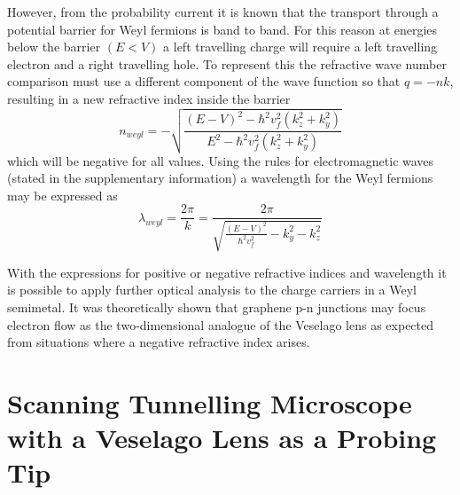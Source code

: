 \documentclass[prb,twocolumn,aps,superscriptaddress,showpacs,floatfix]{revtex4}
\begin{document}
	However, from the probability current it is known that the transport through a potential barrier for Weyl fermions is band to band. For this reason at energies below the barrier $(E<V)$ a left travelling charge will require a left travelling electron and a right travelling hole. To represent this the refractive wave number comparison must use a different component of the wave function so that $q=-nk$, resulting in a new refractive index inside the barrier
	\begin{equation}
		n_{weyl}=-\sqrt{\frac{\left(E-V\right)^{2}-\hbar^{2} v_{f}^{2}\left(k_{z}^{2}+k_{y}^{2}\right)}{E^{2}-\hbar^{2} v_{f}^{2}\left(k_{z}^{2}+k_{y}^{2}\right)}}
	\end{equation}
	which will be negative for all values. Using the rules for electromagnetic waves (stated in the supplementary information) a wavelength for the Weyl fermions may be expressed as
	\begin{equation}
		\lambda_{weyl}=\frac{2\pi}{k}=\frac{2\pi}{\sqrt{\frac{\left(E-V\right)^{2}}{\hbar^{2}v_{f}^{2}}-k_{y}^{2}-k_{z}^{2}}}
	\end{equation}

	With the expressions for positive or negative refractive indices and wavelength it is possible to apply further optical analysis to the charge carriers in a Weyl semimetal. It was theoretically shown that graphene p-n junctions may focus electron flow as the two-dimensional analogue of the Veselago lens\cite{p1} as expected from situations where a negative refractive index arises.


\section{Scanning Tunnelling Microscope with a Veselago Lens as a Probing Tip}		
\end{document}
